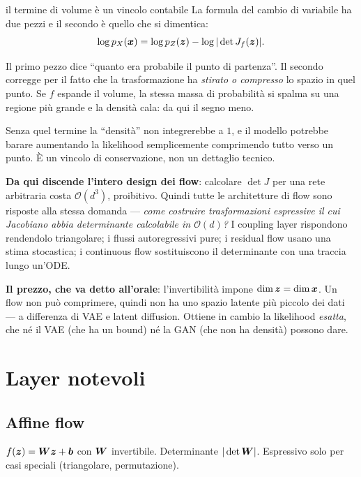 \begin{intuizione}{il termine di volume è un vincolo contabile}
La formula del cambio di variabile ha due pezzi e il secondo è quello che si dimentica:
\[
\log p_X(\bm{x}) = \log p_Z(\bm{z}) - \log|\det J_f(\bm{z})|.
\]

Il primo pezzo dice ``quanto era probabile il punto di partenza''. Il secondo corregge per il fatto che la trasformazione ha \emph{stirato o compresso} lo spazio in quel punto. Se $f$ espande il volume, la stessa massa di probabilità si spalma su una regione più grande e la densità cala: da qui il segno meno.

Senza quel termine la ``densità'' non integrerebbe a $1$, e il modello potrebbe barare aumentando la likelihood semplicemente comprimendo tutto verso un punto. È un vincolo di conservazione, non un dettaglio tecnico.

\textbf{Da qui discende l'intero design dei flow}: calcolare $\det J$ per una rete arbitraria costa $\mathcal{O}(d^3)$, proibitivo. Quindi tutte le architetture di flow sono risposte alla stessa domanda — \emph{come costruire trasformazioni espressive il cui Jacobiano abbia determinante calcolabile in $\mathcal{O}(d)$?} I coupling layer rispondono rendendolo triangolare; i flussi autoregressivi pure; i residual flow usano una stima stocastica; i continuous flow sostituiscono il determinante con una traccia lungo un'ODE.

\textbf{Il prezzo, che va detto all'orale}: l'invertibilità impone $\dim \bm{z} = \dim \bm{x}$. Un flow non può comprimere, quindi non ha uno spazio latente più piccolo dei dati — a differenza di VAE e latent diffusion. Ottiene in cambio la likelihood \emph{esatta}, che né il VAE (che ha un bound) né la GAN (che non ha densità) possono dare.
\end{intuizione}

\section{Layer notevoli}

\subsection{Affine flow}
$f(\bm{z}) = \bm{W}\bm{z} + \bm{b}$ con $\bm{W}$ invertibile. Determinante $|\det \bm{W}|$. Espressivo solo per casi speciali (triangolare, permutazione).

